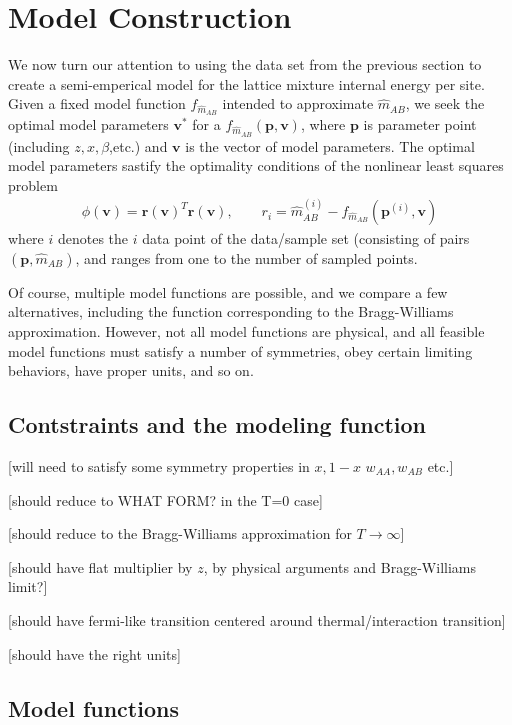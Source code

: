 \documentclass[10pt]{article}
\begin{document}
\section{Model Construction}

We now turn our attention to using the data set from the previous section to create a semi-emperical model for the lattice mixture internal energy per site.
Given a fixed model function $f_{\hat{m}_{AB}}$ intended to approximate $\hat{m}_{AB}$, we seek the optimal model parameters $\mathbf{v}^*$ for a $f_{\hat{m}_{AB}}(\mathbf{p},\mathbf{v})$, where $\mathbf{p}$ is  parameter point (including $z,x,\beta$,etc.) and $\mathbf{v}$ is the vector of model parameters.
The optimal model parameters sastify the optimality conditions of the nonlinear least squares problem
\begin{align}
\phi(\mathbf{v}) = \mathbf{r}(\mathbf{v})^T \mathbf{r}(\mathbf{v}),
\quad\quad r_i = \hat{m}_{AB}^{(i)} - f_{\hat{m}_{AB}}(\mathbf{p}^{(i)},\mathbf{v})
\end{align}
where $i$ denotes the $i$ data point of the data/sample set (consisting of pairs $(\mathbf{p},\hat{m}_{AB})$, and ranges from one to the number of sampled points.

Of course, multiple model functions are possible, and we compare a few alternatives, including the function corresponding to the Bragg-Williams approximation.
However, not all model functions are physical, and all feasible model functions must satisfy a number of symmetries, obey certain limiting behaviors, have proper units, and so on.

\subsection{Contstraints and the modeling function}

[will need to satisfy some symmetry properties in $x, 1-x$ $w_{AA},w_{AB}$ etc.]

[should reduce to WHAT FORM? in the T=0 case]

[should reduce to the Bragg-Williams approximation for $T \rightarrow \infty$]

[should have flat multiplier by $z$, by physical arguments and Bragg-Williams limit?]

[should have fermi-like transition centered around thermal/interaction transition]

[should have the right units]


\subsection{Model functions}
\end{document}
